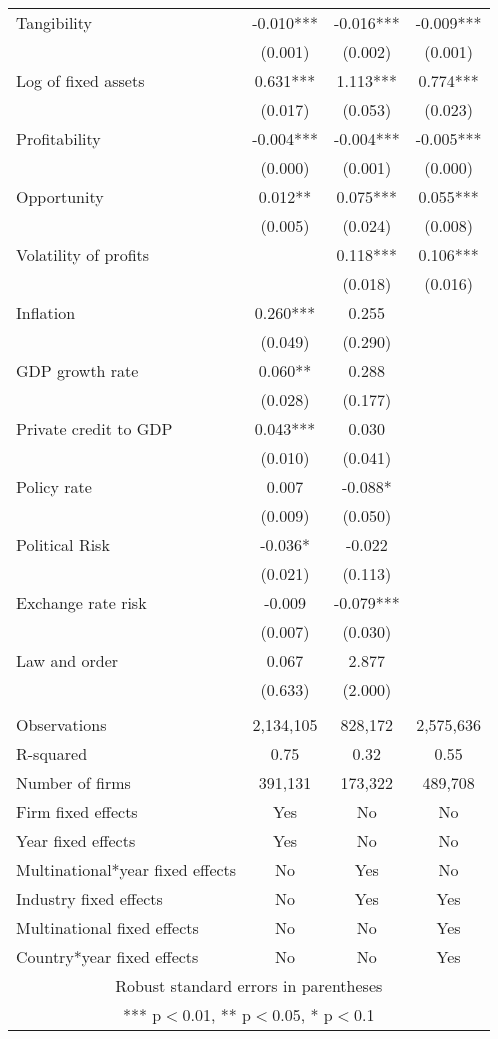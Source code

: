 \begin{tabular}{lccc}
Tangibility & -0.010*** & -0.016*** & -0.009*** \\
 & (0.001) & (0.002) & (0.001) \\
Log of fixed assets & 0.631*** & 1.113*** & 0.774*** \\
 & (0.017) & (0.053) & (0.023) \\
Profitability & -0.004*** & -0.004*** & -0.005*** \\
 & (0.000) & (0.001) & (0.000) \\
Opportunity & 0.012** & 0.075*** & 0.055*** \\
 & (0.005) & (0.024) & (0.008) \\
Volatility of profits &  & 0.118*** & 0.106*** \\
 &  & (0.018) & (0.016) \\
Inflation & 0.260*** & 0.255 &  \\
 & (0.049) & (0.290) &  \\
GDP growth rate & 0.060** & 0.288 &  \\
 & (0.028) & (0.177) &  \\
Private credit to GDP & 0.043*** & 0.030 &  \\
 & (0.010) & (0.041) &  \\
Policy rate & 0.007 & -0.088* &  \\
 & (0.009) & (0.050) &  \\
Political Risk & -0.036* & -0.022 &  \\
 & (0.021) & (0.113) &  \\
Exchange rate risk & -0.009 & -0.079*** &  \\
 & (0.007) & (0.030) &  \\
Law and order & 0.067 & 2.877 &  \\
 & (0.633) & (2.000) &  \\
 &  &  &  \\
Observations & 2,134,105 & 828,172 & 2,575,636 \\
R-squared & 0.75 & 0.32 & 0.55 \\
Number of firms & 391,131 & 173,322 & 489,708 \\
Firm fixed effects & Yes & No & No \\
Year fixed effects & Yes & No & No \\
Multinational*year fixed effects & No & Yes & No \\
Industry fixed effects & No & Yes & Yes \\
Multinational fixed effects & No & No & Yes \\
 Country*year fixed effects & No & No & Yes \\ \hline
\multicolumn{4}{c}{ Robust standard errors in parentheses} \\
\multicolumn{4}{c}{ *** p$<$0.01, ** p$<$0.05, * p$<$0.1} \\
\end{tabular}

